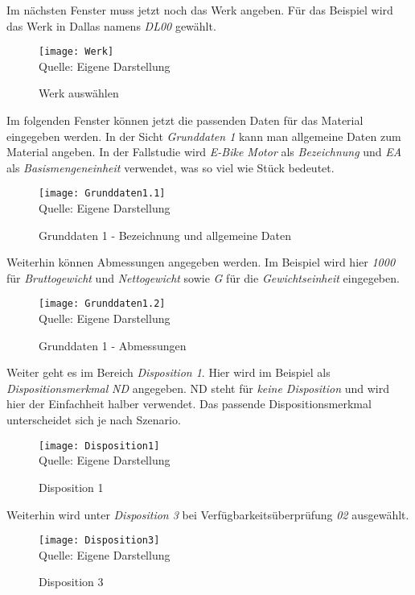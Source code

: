 Im nächsten Fenster muss jetzt noch das Werk angeben. Für das Beispiel wird das Werk in Dallas namens \textit{DL00} gewählt. 
\begin{figure}[H]
    \caption{Werk auswählen}\label{fig:werk}
    \texttt{[image: Werk]}
    \\
    Quelle: Eigene Darstellung
\end{figure}
Im folgenden Fenster können jetzt die passenden Daten für das Material eingegeben werden. In der Sicht \textit{Grunddaten 1} kann man allgemeine Daten zum
 Material angeben. In der Fallstudie wird \textit{E-Bike Motor} als \textit{Bezeichnung} und \textit{EA} als \textit{Basismengeneinheit} verwendet, was so viel wie Stück bedeutet.
\begin{figure}[H]
    \caption{Grunddaten 1 - Bezeichnung und allgemeine Daten}\label{fig:grunddaten1.1}
    \texttt{[image: Grunddaten1.1]}
    \\
    Quelle: Eigene Darstellung
\end{figure}
 
 Weiterhin können Abmessungen angegeben werden. Im Beispiel wird hier \textit{1000} für \textit{Bruttogewicht} und \textit{Nettogewicht} sowie \textit{G} für die \textit{Gewichtseinheit} eingegeben.

\begin{figure}[H]
    \caption{Grunddaten 1 - Abmessungen}\label{fig:grunddaten1.2}
    \texttt{[image: Grunddaten1.2]}
    \\
    Quelle: Eigene Darstellung
\end{figure}

Weiter geht es im Bereich \textit{Disposition 1}. Hier wird im Beispiel als \textit{Dispositionsmerkmal} \textit{ND} angegeben. ND steht für \textit{keine Disposition} und wird hier der Einfachheit halber verwendet. 
Das passende Dispositionsmerkmal unterscheidet sich je nach Szenario.

\begin{figure}[H]
    \caption{Disposition 1}\label{fig:disposition1}
    \texttt{[image: Disposition1]}
    \\
    Quelle: Eigene Darstellung
\end{figure}

Weiterhin wird unter \textit{Disposition 3} bei Verfügbarkeitsüberprüfung \textit{02} ausgewählt.

\begin{figure}[H]
    \caption{Disposition 3}\label{fig:disposition3}
    \texttt{[image: Disposition3]}
    \\
    Quelle: Eigene Darstellung
\end{figure}

